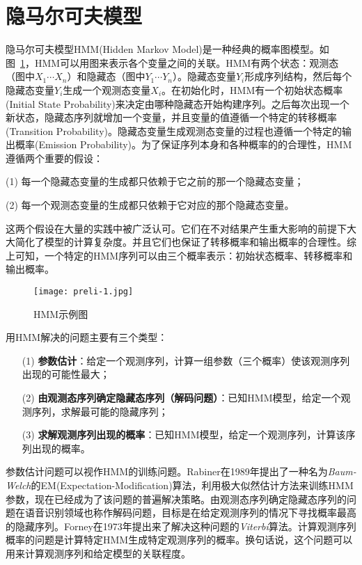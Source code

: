 \section{隐马尔可夫模型}

隐马尔可夫模型HMM(Hidden Markov Model)是一种经典的概率图模型。如图~\ref{fig:hmm}，HMM可以用图来表示各个变量之间的关联。HMM有两个状态：观测态（图中$X_1 \cdots X_n$）和隐藏态（图中$Y_1 \cdots Y_n$）。隐藏态变量$Y_i$形成序列结构，然后每个隐藏态变量$Y_i$生成一个观测态变量$X_i$。在初始化时，HMM有一个初始状态概率(Initial State Probability)来决定由哪种隐藏态开始构建序列。之后每次出现一个新状态，隐藏态序列就增加一个变量，并且变量的值遵循一个特定的转移概率(Transition Probability)。隐藏态变量生成观测态变量的过程也遵循一个特定的输出概率(Emission Probability)。为了保证序列本身和各种概率的的合理性，HMM遵循两个重要的假设：
\begin{enumerate*}		
	\item[(1)] 每一个隐藏态变量的生成都只依赖于它之前的那一个隐藏态变量；
	\item[(2)] 每一个观测态变量的生成都只依赖于它对应的那个隐藏态变量。
\end{enumerate*}
这两个假设在大量的实践中被广泛认可。它们在不对结果产生重大影响的前提下大大简化了模型的计算复杂度。并且它们也保证了转移概率和输出概率的合理性。综上可知，一个特定的HMM序列可以由三个概率表示：初始状态概率、转移概率和输出概率。

\begin{figure}[htbp]
	\centering
	\begin{minipage}[htbp]{\textwidth}
		\centering
		\texttt{[image: preli-1.jpg]}
		\caption[HMM示例图]
		{HMM示例图\label{fig:hmm}}		
	\end{minipage}     
\end{figure}

用HMM解决的问题主要有三个类型：

\begin{enumerate}		
	\item[(1)] \textbf{参数估计}：给定一个观测序列，计算一组参数（三个概率）使该观测序列出现的可能性最大；
	\item[(2)] \textbf{由观测态序列确定隐藏态序列（解码问题）}：已知HMM模型，给定一个观测序列，求解最可能的隐藏序列；
	\item[(3)] \textbf{求解观测序列出现的概率}：已知HMM模型，给定一个观测序列，计算该序列出现的概率。
\end{enumerate}

参数估计问题可以视作HMM的训练问题。Rabiner在1989年提出了一种名为\emph{Baum-Welch}\cite{Rabiner:1989}的EM(Expectation-Modification)算法，利用极大似然估计方法来训练HMM参数，现在已经成为了该问题的普遍解决策略。由观测态序列确定隐藏态序列的问题在语音识别领域也称作解码问题，目标是在给定观测序列的情况下寻找概率最高的隐藏序列。Forney在1973年提出来了解决这种问题的\emph{Viterbi}\cite{Forney:1973}算法。计算观测序列概率的问题是计算特定HMM生成特定观测序列的概率。换句话说，这个问题可以用来计算观测序列和给定模型的关联程度。



